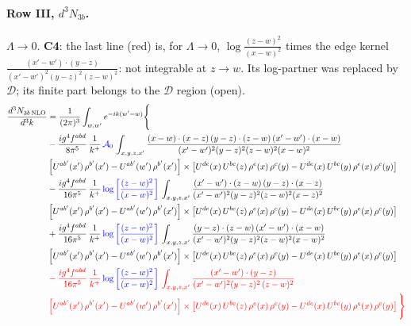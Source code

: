 \documentclass[10pt]{article}
\numberwithin{equation}{section}
\newcommand{\new}[1]{{\color{blue}#1}}
\newcommand{\old}[1]{{\color{red}#1}}
\newcommand{\rc}{\color{red}}
\begin{document}
\paragraph{Row III, $d^3N_{3b}$.}
$\Lambda\to0$. \textbf{C4}: the last line (\old{red}) is, for $\Lambda\to0$, $\log\frac{(z-w)^2}{(x-w)^2}$ times the edge kernel $\frac{(x'-w')\cdot(y-z)}{(x'-w')^2(y-z)^2(z-w)^2}$: not integrable at $z\to w$. Its log-partner was replaced by $\mathcal D$; its finite part belongs to the $\mathcal D$ region (open).
\begin{align}
\frac{d^{3}N_{3b\,\rm NLO}}{d^{3}k} & = \frac{1}{(2\pi)^{3}}\int_{w,w'}e^{-ik(w'-w)}\Bigg\{\notag \\
&-\frac{ig^{4}f^{abd}}{8\pi^{5}}\,\frac{1}{k^{+}}\,\new{\mathcal{A}_{0}}\,\int_{x,y,z,x'}
\frac{(x-w)\cdot(x-z)\,(y-z)\cdot(z-w)\,(x'-w')\cdot(x-w)}{(x'-w')^{2}(y-z)^{2}(z-w)^{2}(x-w)^{2}}\notag \\ & \left[U^{ab'}(x')\,\rho^{b'}(x')-U^{ab'}(w')\, \rho^{b'}(x')\right]\times \left[U^{de}(x)\,U^{bc}(z)\, \rho^{e}(x)\,\rho^{c}(y)-U^{de}(x)\,U^{bc}(y)\,\rho^{e}(x)\,\rho^{c}(y)\right] \notag \\
& -\frac{ig^{4}f^{abd}}{16\pi^{5}}\,\frac{1}{k^{+}}\,\new{\log{\left[\frac{(z-w)^{2}}{(x-w)^{2}}\right]}}\,\int_{x,y,z,x'}
\frac{(x'-w')\cdot(z-w)\,(y-z)\cdot(x-z)}{(x'-w')^{2}(y-z)^{2}(z-w)^{2}(x-z)^{2}}\notag \\
&\left[U^{ab'}(x')\,\rho^{b'}(x')-U^{ab'}(w')\, \rho^{b'}(x')\right]\times \left[U^{de}(x)\,U^{bc}(z)\, \rho^{e}(x)\,\rho^{c}(y)-U^{de}(x)\,U^{bc}(y)\,\rho^{e}(x)\,\rho^{c}(y)\right] \notag \\
&+ \frac{ig^{4}f^{abd}}{16\pi^{5}}\,\frac{1}{k^{+}}\,\new{\log{\left[\frac{(z-w)^{2}}{(x-w)^{2}}\right]}}\,\int_{x,y,z,x'}
\frac{(y-z)\cdot(z-w)\,(x'-w')\cdot(x-w)}{(x'-w')^{2}(y-z)^{2}(z-w)^{2}(x-w)^{2}}\notag \\ 
& \left[U^{ab'}(x')\,\rho^{b'}(x')-U^{ab'}(w')\, \rho^{b'}(x')\right]\times \left[U^{de}(x)\,U^{bc}(z)\, \rho^{e}(x)\,\rho^{c}(y)-U^{de}(x)\,U^{bc}(y)\,\rho^{e}(x)\,\rho^{c}(y)\right] \notag \\
& \rc  -\frac{ig^{4}f^{abd}}{16\pi^{5}}\,\frac{1}{k^{+}}\,\new{\log{\left[\frac{(z-w)^{2}}{(x-w)^{2}}\right]}}\,\int_{x,y,z,x'}
\frac{(x'-w')\cdot(y-z)}{(x'-w')^{2}(y-z)^{2}\,(z-w)^{2}}\notag \\ & \rc  \left[U^{ab'}(x')\,\rho^{b'}(x')-U^{ab'}(w')\, \rho^{b'}(x')\right]\times \left[U^{de}(x)\,U^{bc}(z)\, \rho^{e}(x)\,\rho^{c}(y)-U^{de}(x)\,U^{bc}(y)\,\rho^{e}(x)\,\rho^{c}(y)\right]\Bigg\} \label{eq:F:G1IIIN3b}
\end{align}
\end{document}
